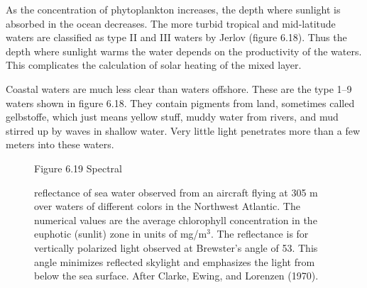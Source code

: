 As the concentration of phytoplankton increases, the depth where
sunlight is absorbed in the ocean decreases. The more turbid tropical
and mid-latitude waters are classified as type II and III waters by
Jerlov (figure 6.18). Thus the depth where sunlight warms the water
depends on the productivity of the waters. This complicates the
calculation of solar heating of the mixed layer.

Coastal waters are much less clear than waters offshore. These are the
type 1--9 waters shown in figure 6.18. They contain pigments from
land, sometimes called gelbstoffe, which just means yellow stuff,
muddy water from rivers, and mud stirred up by waves in shallow
water. Very little light penetrates more than a few meters into these
waters.

\begin{figure}[t!]
\footnotesize
Figure 6.19 Spectral \rule{0mm}{4ex}reflectance of sea water observed
from an aircraft flying at 305 m over waters of different colors in
the Northwest Atlantic. The numerical values are the average
chlorophyll concentration in the euphotic (sunlit) zone in units of
mg/m$^3$. The reflectance is for vertically polarized light observed
at Brewster's angle of 53\degrees. This angle minimizes reflected
skylight and emphasizes the light from below the sea surface. After
Clarke, Ewing, and Lorenzen (1970).
\label{fig:reflectance}
\vspace{-3ex}
\end{figure}


